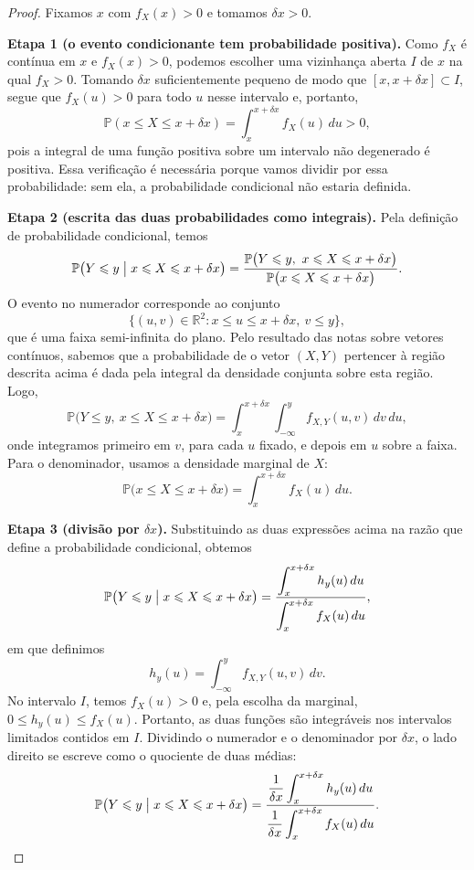 \documentclass[12pt,portuguese]{article}
\theoremstyle{definition}
\theoremstyle{plainexercise}
\theoremstyle{starredexercise}
\theoremstyle{definition}
\begin{document}
\begin{proof}
Fixamos $x$ com $f_X(x) > 0$ e tomamos $\delta x > 0$.

\smallskip
\noindent\textbf{Etapa 1 (o evento condicionante tem probabilidade positiva).}
Como $f_X$ é contínua em $x$ e $f_X(x) > 0$, podemos escolher uma vizinhança aberta $I$ de
$x$ na qual $f_X > 0$. Tomando $\delta x$ suficientemente pequeno de modo que
$[x, x+\delta x] \subset I$, segue que $f_X(u) > 0$ para todo $u$ nesse intervalo e,
portanto,
\[
  \mathbb{P}(x \leqslant X \leqslant x+\delta x) = \int_x^{x+\delta x} f_X(u)\,du
  > 0,
\]
pois a integral de uma função positiva sobre um intervalo não degenerado é positiva.
Essa verificação é necessária porque vamos dividir por essa probabilidade: sem ela, a
probabilidade condicional não estaria definida.

\smallskip
\noindent\textbf{Etapa 2 (escrita das duas probabilidades como integrais).}
Pela definição de probabilidade condicional, temos
\[
  \mathbb{P}\bigl(Y \leqslant y \bigm| x \leqslant X \leqslant x+\delta x\bigr)
  = \frac{\mathbb{P}\bigl(Y \leqslant y,\ x \leqslant X \leqslant x+\delta x\bigr)}
  {\mathbb{P}\bigl(x \leqslant X \leqslant x+\delta x\bigr)}.
\]
O evento no numerador corresponde ao conjunto
\[
  \bigl\{(u,v) \in \mathbb{R}^2 : x \leqslant u \leqslant x+\delta x,\ v \leqslant y\bigr\},
\]
que é uma faixa semi-infinita do plano. Pelo resultado das notas sobre vetores contínuos,
sabemos que a probabilidade de o vetor $(X,Y)$ pertencer à região descrita acima
é dada pela integral da densidade conjunta sobre esta região. Logo,
\[
  \mathbb{P}\bigl(Y \leqslant y,\ x \leqslant X \leqslant x+\delta x\bigr)
  = \int_x^{x+\delta x}\!\!\int_{-\infty}^{y} f_{X,Y}(u,v)\,dv\,du,
\]
onde integramos primeiro em $v$, para cada $u$ fixado, e depois em $u$ sobre a faixa.
Para o denominador, usamos a densidade marginal de $X$:
\[
  \mathbb{P}\bigl(x \leqslant X \leqslant x+\delta x\bigr)
  = \int_x^{x+\delta x} f_X(u)\,du.
\]

\smallskip
\noindent\textbf{Etapa 3 (divisão por $\delta x$).}
Substituindo as duas expressões acima na razão que define a probabilidade condicional,
obtemos
\[
  \mathbb{P}\bigl(Y \leqslant y \bigm| x \leqslant X \leqslant x+\delta x\bigr)
  = \frac{\displaystyle\int_x^{x+\delta x} h_y(u)\,du}
         {\displaystyle\int_x^{x+\delta x} f_X(u)\,du},
\]
em que definimos
\[
  h_y(u) = \int_{-\infty}^{y} f_{X,Y}(u,v)\,dv.
\]
No intervalo $I$, temos $f_X(u)>0$ e, pela escolha da marginal,
$0\leqslant h_y(u)\leqslant f_X(u)$. Portanto, as duas funções são integráveis
nos intervalos limitados contidos em $I$.
Dividindo o numerador e o denominador por $\delta x$, o lado direito se escreve como o
quociente de duas médias:
\[
  \mathbb{P}\bigl(Y \leqslant y \bigm| x \leqslant X \leqslant x+\delta x\bigr)
  = \frac{\dfrac{1}{\delta x}\displaystyle\int_x^{x+\delta x} h_y(u)\,du}
         {\dfrac{1}{\delta x}\displaystyle\int_x^{x+\delta x} f_X(u)\,du}.
\]


\end{proof}
\end{document}
